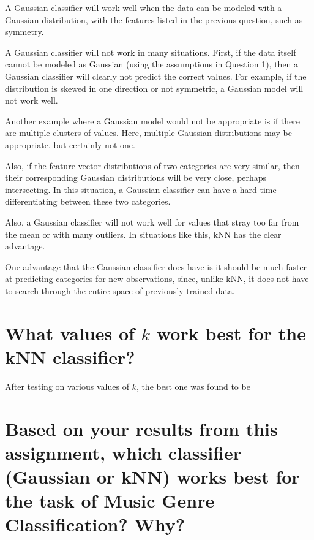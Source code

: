 \documentclass[a4paper,titlepage]{article}
\begin{document}
	A Gaussian classifier will work well when the data can be modeled with a Gaussian distribution, with the features listed in the previous question, such as symmetry.
	
	A Gaussian classifier will not work in many situations. First, if the data itself cannot be modeled as Gaussian (using the assumptions in Question 1), then a Gaussian classifier will clearly not predict the correct values. For example, if the distribution is skewed in one direction or not symmetric, a Gaussian model will not work well.
	
	Another example where a Gaussian model would not be appropriate is if there are multiple clusters of values. Here, multiple Gaussian distributions may be appropriate, but certainly not one.
	
	Also, if the feature vector distributions of two categories are very similar, then their corresponding Gaussian distributions will be very close, perhaps intersecting. In this situation, a Gaussian classifier can have a hard time differentiating between these two categories.
	
	Also, a Gaussian classifier will not work well for values that stray too far from the mean or with many outliers. In situations like this, kNN has the clear advantage.
	
	One advantage that the Gaussian classifier does have is it should be much faster at predicting categories for new observations, since, unlike kNN, it does not have to search through the entire space of previously trained data.
	
	\section{What values of $k$ work best for the kNN classifier?}

	After testing on various values of $k$, the best one was found to be 
	
	
	\section{Based on your results from this assignment, which classifier (Gaussian or kNN) works best for the task of Music Genre Classification? Why?}
	
\end{document}
